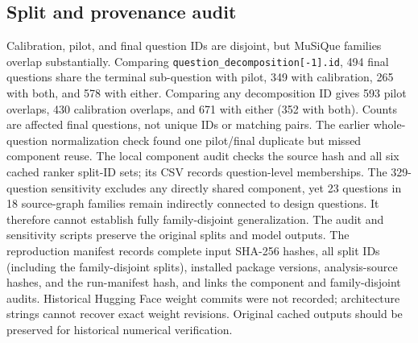\subsection{Split and provenance audit}

Calibration, pilot, and final question IDs are disjoint, but MuSiQue families overlap substantially. Comparing \texttt{question\_decomposition[-1].id}, 494 final questions share the terminal sub-question with pilot, 349 with calibration, 265 with both, and 578 with either. Comparing any decomposition ID gives 593 pilot overlaps, 430 calibration overlaps, and 671 with either (352 with both). Counts are affected final questions, not unique IDs or matching pairs. The earlier whole-question normalization check found one pilot/final duplicate but missed component reuse. The local component audit checks the source hash and all six cached ranker split-ID sets; its CSV records question-level memberships. The 329-question sensitivity excludes any directly shared component, yet 23 questions in 18 source-graph families remain indirectly connected to design questions. It therefore cannot establish fully family-disjoint generalization. The audit and sensitivity scripts preserve the original splits and model outputs. The reproduction manifest records complete input SHA-256 hashes, all split IDs (including the family-disjoint splits), installed package versions, analysis-source hashes, and the run-manifest hash, and links the component and family-disjoint audits. Historical Hugging Face weight commits were not recorded; architecture strings cannot recover exact weight revisions. Original cached outputs should be preserved for historical numerical verification.
